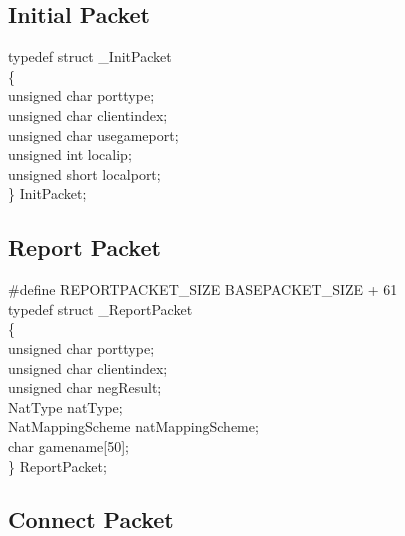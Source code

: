 \documentclass[oneside,titlepage,a4paper]{Definition/retrospy} %
\begin{document}
%
%
%
%


\subsection{Initial Packet}
\begin{mybox}
	typedef struct \_InitPacket\\
	\{\\
	unsigned char porttype;\\
	unsigned char clientindex;\\
	unsigned char usegameport;\\
	unsigned int localip;\\
	unsigned short localport;\\
	\} InitPacket;\\
\end{mybox}

\subsection{Report Packet}

\begin{mybox}
	\#define REPORTPACKET\_SIZE BASEPACKET\_SIZE + 61\\
	typedef struct \_ReportPacket\\
	\{\\
	unsigned char porttype;\\
	unsigned char clientindex;\\
	unsigned char negResult;\\
	NatType natType;\\
	NatMappingScheme natMappingScheme;\\
	char gamename[50];\\
	\} ReportPacket;\\
\end{mybox}



\subsection{Connect Packet}
\end{document}
